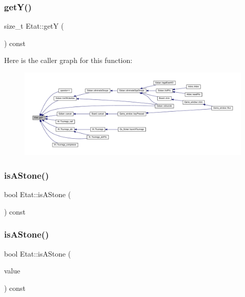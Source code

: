 \subsubsection{\texorpdfstring{get\+Y()}{getY()}}
{\footnotesize\ttfamily size\+\_\+t Etat\+::getY (\begin{DoxyParamCaption}{ }\end{DoxyParamCaption}) const}

Here is the caller graph for this function\+:
\nopagebreak
\begin{figure}[H]
\begin{center}
\leavevmode
\includegraphics[width=350pt]{class_etat_a3e3e915f2261c83989a983e84b1273c1_icgraph}
\end{center}
\end{figure}
\mbox{\label{class_etat_a98cc204acc13280c277e2aa6a32a54ec}} 
\subsubsection{\texorpdfstring{is\+A\+Stone()}{isAStone()}\hspace{0.1cm}{\footnotesize\ttfamily [1/2]}}
{\footnotesize\ttfamily bool Etat\+::is\+A\+Stone (\begin{DoxyParamCaption}{ }\end{DoxyParamCaption}) const}

\mbox{\label{class_etat_a64d8c0196e3e4de340726e2be29dec97}} 
\subsubsection{\texorpdfstring{is\+A\+Stone()}{isAStone()}\hspace{0.1cm}{\footnotesize\ttfamily [2/2]}}
{\footnotesize\ttfamily bool Etat\+::is\+A\+Stone (\begin{DoxyParamCaption}\item[{const \hyperlink{class_etat_af3ddb2296ffc379b7f3ad2bf832f294e}{V\+AL} \&}]{value }\end{DoxyParamCaption}) const}

